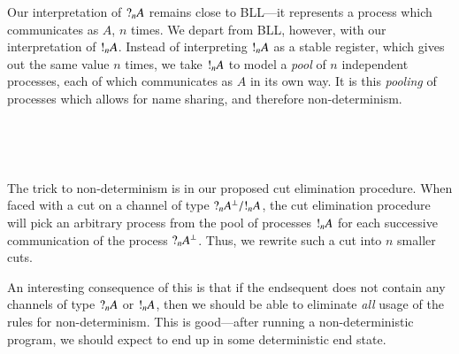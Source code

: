 \documentclass[10pt,a4paper,twocolumn,notitlepage]{article}
\begin{document}
Our interpretation of $\give[n]{A}$ remains close to BLL---it represents a
process which communicates as $A$, $n$ times.
We depart from BLL, however, with our interpretation of $\take[n]{A}$.
Instead of interpreting $\take[n]{A}$ as a stable register, which gives out the
same value $n$ times, we take $\take[n]{A}$ to model a \emph{pool} of $n$
independent processes, each of which communicates as $A$ in its own way.
It is this \emph{pooling} of processes which allows for name sharing, and
therefore non-determinism.
\begin{center}
  \begin{proofbox}
  \end{proofbox}
  \\[1\baselineskip]
  \begin{proofbox}
    \SYM{\take[1]{}}
  \end{proofbox}
  \begin{proofbox}
    \SYM{\give{}}
  \end{proofbox}
  \\[1\baselineskip]
  \begin{proofbox}
  \end{proofbox}
\end{center}
The trick to non-determinism is in our proposed cut elimination procedure.
When faced with a cut on a channel of type $\give[n]{A^\bot} / \take[n]{A}$, the
cut elimination procedure will pick an arbitrary process from the pool of
processes $\take[n]{A}$ for each successive communication of the process
$\give[n]{A^\bot}$.
Thus, we rewrite such a cut into $n$ smaller cuts. 

An interesting consequence of this is that if the endsequent does not contain
any channels of type $\give[n]{A}$ or $\take[n]{A}$, then we should be able to
eliminate \emph{all} usage of the rules for non-determinism. This is
good---after running a non-deterministic program, we should expect to end up in
some deterministic end state.
\end{document}
